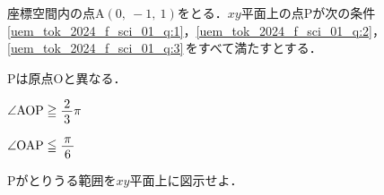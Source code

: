 ﻿\documentclass[../../../uem_tok_q.tex]{subfiles}
\begin{document}
    座標空間内の点$\mathrm{A}(0,\:-1,\:1)$をとる．$xy$平面上の点Pが次の条件%
    \,\ref{uem_tok_2024_f_sci_01_q:1}，\ref{uem_tok_2024_f_sci_01_q:2}，%
    \ref{uem_tok_2024_f_sci_01_q:3}\,をすべて満たすとする．

    \begin{myenua}
            \item Pは原点Oと異なる． \label{uem_tok_2024_f_sci_01_q:1}
            \item $\angle\mathrm{AOP}\geqq\myfraca{2}{3}\pi$%
                \label{uem_tok_2024_f_sci_01_q:2}
            \item $\angle\mathrm{OAP}\leqq\myfraca{\pi}{6}$%
                \label{uem_tok_2024_f_sci_01_q:3}
    \end{myenua}
    Pがとりうる範囲を$xy$平面上に図示せよ．
\end{document}
